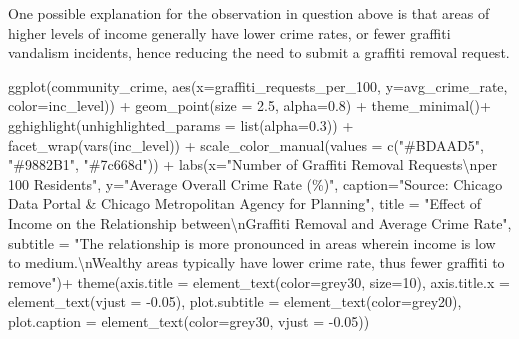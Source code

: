 \documentclass[
]{report}
\newenvironment{Shaded}{}{}
\newcommand{\AttributeTok}[1]{\textcolor[rgb]{0.65,0.15,0.64}{#1}}
\newcommand{\DecValTok}[1]{\textcolor[rgb]{0.60,0.41,0.00}{#1}}
\newcommand{\FloatTok}[1]{\textcolor[rgb]{0.60,0.41,0.00}{#1}}
\newcommand{\FunctionTok}[1]{\textcolor[rgb]{0.25,0.47,0.95}{#1}}
\newcommand{\NormalTok}[1]{\textcolor[rgb]{0.22,0.23,0.26}{#1}}
\newcommand{\SpecialCharTok}[1]{\textcolor[rgb]{0.00,0.52,0.74}{#1}}
\newcommand{\StringTok}[1]{\textcolor[rgb]{0.31,0.63,0.31}{#1}}
\begin{document}
One possible explanation for the observation in question above is that
areas of higher levels of income generally have lower crime rates, or
fewer graffiti vandalism incidents, hence reducing the need to submit a
graffiti removal request.

\begin{Shaded}
\begin{Highlighting}[]
\FunctionTok{ggplot}\NormalTok{(community\_crime, }\FunctionTok{aes}\NormalTok{(}\AttributeTok{x=}\NormalTok{graffiti\_requests\_per\_100, }\AttributeTok{y=}\NormalTok{avg\_crime\_rate, }\AttributeTok{color=}\NormalTok{inc\_level)) }\SpecialCharTok{+}
  \FunctionTok{geom\_point}\NormalTok{(}\AttributeTok{size =} \FloatTok{2.5}\NormalTok{, }\AttributeTok{alpha=}\FloatTok{0.8}\NormalTok{) }\SpecialCharTok{+}
  \FunctionTok{theme\_minimal}\NormalTok{()}\SpecialCharTok{+}
  \FunctionTok{gghighlight}\NormalTok{(}\AttributeTok{unhighlighted\_params =} \FunctionTok{list}\NormalTok{(}\AttributeTok{alpha=}\FloatTok{0.3}\NormalTok{)) }\SpecialCharTok{+} 
  \FunctionTok{facet\_wrap}\NormalTok{(}\FunctionTok{vars}\NormalTok{(inc\_level)) }\SpecialCharTok{+}
  \FunctionTok{scale\_color\_manual}\NormalTok{(}\AttributeTok{values =} \FunctionTok{c}\NormalTok{(}\StringTok{"\#BDAAD5"}\NormalTok{, }\StringTok{"\#9882B1"}\NormalTok{, }\StringTok{"\#7c668d"}\NormalTok{)) }\SpecialCharTok{+}
  \FunctionTok{labs}\NormalTok{(}\AttributeTok{x=}\StringTok{"Number of Graffiti Removal Requests}\SpecialCharTok{\textbackslash{}n}\StringTok{per 100 Residents"}\NormalTok{,}
       \AttributeTok{y=}\StringTok{"Average Overall Crime Rate (\%)"}\NormalTok{,}
       \AttributeTok{caption=}\StringTok{"Source: Chicago Data Portal \& Chicago Metropolitan Agency for Planning"}\NormalTok{,}
       \AttributeTok{title =} \StringTok{"Effect of Income on the Relationship between}\SpecialCharTok{\textbackslash{}n}\StringTok{Graffiti Removal and Average Crime Rate"}\NormalTok{,}
       \AttributeTok{subtitle =} \StringTok{"The relationship is more pronounced in areas wherein income is low to medium.}\SpecialCharTok{\textbackslash{}n}\StringTok{Wealthy areas typically have lower crime rate, thus fewer graffiti to remove"}\NormalTok{)}\SpecialCharTok{+}
  \FunctionTok{theme}\NormalTok{(}\AttributeTok{axis.title =} \FunctionTok{element\_text}\NormalTok{(}\AttributeTok{color=}\StringTok{\textquotesingle{}grey30\textquotesingle{}}\NormalTok{, }\AttributeTok{size=}\DecValTok{10}\NormalTok{),}
        \AttributeTok{axis.title.x =} \FunctionTok{element\_text}\NormalTok{(}\AttributeTok{vjust =} \SpecialCharTok{{-}}\FloatTok{0.05}\NormalTok{),}
        \AttributeTok{plot.subtitle =} \FunctionTok{element\_text}\NormalTok{(}\AttributeTok{color=}\StringTok{\textquotesingle{}grey20\textquotesingle{}}\NormalTok{),}
        \AttributeTok{plot.caption =} \FunctionTok{element\_text}\NormalTok{(}\AttributeTok{color=}\StringTok{\textquotesingle{}grey30\textquotesingle{}}\NormalTok{, }\AttributeTok{vjust =} \SpecialCharTok{{-}}\FloatTok{0.05}\NormalTok{))}
\end{Highlighting}
\end{Shaded}
\end{document}
